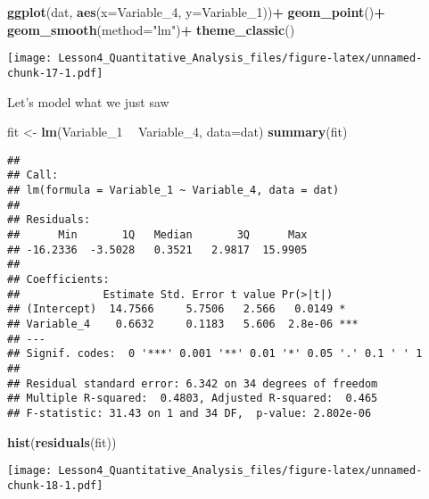 \documentclass[
]{article}
\newenvironment{Shaded}{\begin{snugshade}}{\end{snugshade}}
\newcommand{\DataTypeTok}[1]{\textcolor[rgb]{0.13,0.29,0.53}{#1}}
\newcommand{\DecValTok}[1]{\textcolor[rgb]{0.00,0.00,0.81}{#1}}
\newcommand{\KeywordTok}[1]{\textcolor[rgb]{0.13,0.29,0.53}{\textbf{#1}}}
\newcommand{\NormalTok}[1]{#1}
\newcommand{\OperatorTok}[1]{\textcolor[rgb]{0.81,0.36,0.00}{\textbf{#1}}}
\newcommand{\StringTok}[1]{\textcolor[rgb]{0.31,0.60,0.02}{#1}}
\begin{document}
\begin{Shaded}
\begin{Highlighting}[]
\KeywordTok{ggplot}\NormalTok{(dat, }\KeywordTok{aes}\NormalTok{(}\DataTypeTok{x=}\NormalTok{Variable_}\DecValTok{4}\NormalTok{, }\DataTypeTok{y=}\NormalTok{Variable_}\DecValTok{1}\NormalTok{))}\OperatorTok{+}
\StringTok{  }\KeywordTok{geom_point}\NormalTok{()}\OperatorTok{+}
\StringTok{  }\KeywordTok{geom_smooth}\NormalTok{(}\DataTypeTok{method=}\StringTok{"lm"}\NormalTok{)}\OperatorTok{+}
\StringTok{  }\KeywordTok{theme_classic}\NormalTok{()}
\end{Highlighting}
\end{Shaded}

\texttt{[image: Lesson4\_Quantitative\_Analysis\_files/figure-latex/unnamed-chunk-17-1.pdf]}

Let's model what we just saw

\begin{Shaded}
\begin{Highlighting}[]
\NormalTok{fit <-}\StringTok{ }\KeywordTok{lm}\NormalTok{(Variable_}\DecValTok{1} \OperatorTok{~}\StringTok{ }\NormalTok{Variable_}\DecValTok{4}\NormalTok{, }\DataTypeTok{data=}\NormalTok{dat)}
\KeywordTok{summary}\NormalTok{(fit)}
\end{Highlighting}
\end{Shaded}

\begin{verbatim}
## 
## Call:
## lm(formula = Variable_1 ~ Variable_4, data = dat)
## 
## Residuals:
##      Min       1Q   Median       3Q      Max 
## -16.2336  -3.5028   0.3521   2.9817  15.9905 
## 
## Coefficients:
##             Estimate Std. Error t value Pr(>|t|)    
## (Intercept)  14.7566     5.7506   2.566   0.0149 *  
## Variable_4    0.6632     0.1183   5.606  2.8e-06 ***
## ---
## Signif. codes:  0 '***' 0.001 '**' 0.01 '*' 0.05 '.' 0.1 ' ' 1
## 
## Residual standard error: 6.342 on 34 degrees of freedom
## Multiple R-squared:  0.4803, Adjusted R-squared:  0.465 
## F-statistic: 31.43 on 1 and 34 DF,  p-value: 2.802e-06
\end{verbatim}

\begin{Shaded}
\begin{Highlighting}[]
\KeywordTok{hist}\NormalTok{(}\KeywordTok{residuals}\NormalTok{(fit))}
\end{Highlighting}
\end{Shaded}

\texttt{[image: Lesson4\_Quantitative\_Analysis\_files/figure-latex/unnamed-chunk-18-1.pdf]}
\end{document}
